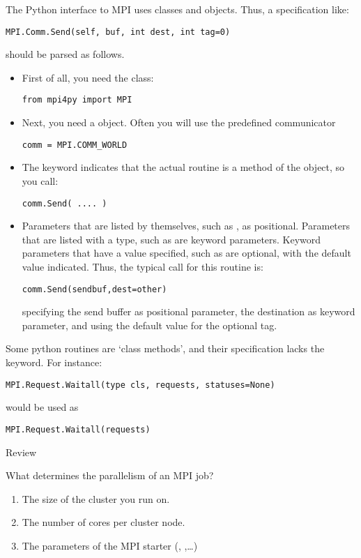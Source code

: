 The Python interface to MPI uses classes and objects. Thus, a
specification like:
\lstset{language=Python} %
\begin{lstlisting}
MPI.Comm.Send(self, buf, int dest, int tag=0)
\end{lstlisting}
should be parsed as follows.
\begin{itemize}
\item First of all, you need the  class:
\begin{lstlisting}
from mpi4py import MPI
\end{lstlisting}
\item Next, you need a  object. Often you will use the
  predefined communicator
\begin{lstlisting}
comm = MPI.COMM_WORLD
\end{lstlisting}
\item The keyword  indicates that the actual routine 
  is a method of the  object, so you call:
\begin{lstlisting}
comm.Send( .... )
\end{lstlisting}
\item Parameters that are listed by themselves, such as , as
  positional. Parameters that are listed with a type, such as  are keyword parameters. Keyword parameters that have a value
  specified, such as  are optional, with the default
  value indicated. Thus, the typical call for this routine is:
\begin{lstlisting}
comm.Send(sendbuf,dest=other)
\end{lstlisting}
  specifying the send buffer as positional parameter, the destination
  as keyword parameter, and using the default value for the optional tag.
\end{itemize}
Some python routines are `class methods', and their specification
lacks the  keyword. For instance:
\begin{lstlisting}
MPI.Request.Waitall(type cls, requests, statuses=None)
\end{lstlisting}
would be used as
\begin{lstlisting}
MPI.Request.Waitall(requests)
\end{lstlisting}
\lstset{language=C} %

 {Review}

\begin{review}
  What determines the parallelism of an MPI job?
  \begin{enumerate}
  \item The size of the cluster you run on.
  \item The number of cores per cluster node.
  \item\label{it:ans:mpiexec} The parameters of the MPI starter (,
    ,\ldots)
  \end{enumerate}
\end{review}


